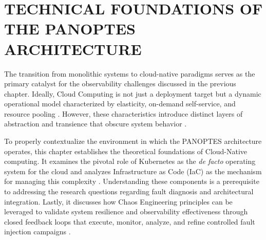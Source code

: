 \chapter{TECHNICAL FOUNDATIONS OF THE PANOPTES ARCHITECTURE}
\label{chap:cloud-computing}

The transition from monolithic systems to cloud-native paradigms \cite{gannon_2017} serves as the primary catalyst for the observability challenges discussed in the previous chapter. Ideally, Cloud Computing is not just a deployment target but a dynamic operational model characterized by elasticity, on-demand self-service, and resource pooling \cite{mell_grance_2011}. However, these characteristics introduce distinct layers of abstraction and transience that obscure system behavior \cite{jamshidi_2018}.

To properly contextualize the environment in which the PANOPTES architecture operates, this chapter establishes the theoretical foundations of Cloud-Native computing. It examines the pivotal role of Kubernetes as the \textit{de facto} operating system for the cloud \cite{luksa_2018, burns_2016} and analyzes Infrastructure as Code (IaC) as the mechanism for managing this complexity \cite{morris_2016}. Understanding these components is a prerequisite to addressing the research questions regarding fault diagnosis and architectural integration. Lastly, it discusses how Chaos Engineering principles can be leveraged to validate system resilience and observability effectiveness through closed feedback loops that execute, monitor, analyze, and refine controlled fault injection campaigns \cite{basiri_2016, torkura_2020}.







